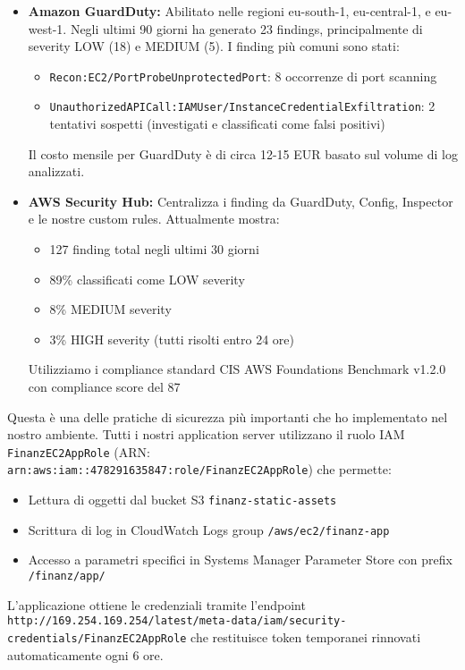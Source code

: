 \begin{itemize}
    \item \textbf{Amazon GuardDuty:} Abilitato nelle regioni eu-south-1, eu-central-1, e eu-west-1. Negli ultimi 90 giorni ha generato 23 findings, principalmente di severity LOW (18) e MEDIUM (5). I finding più comuni sono stati:
        \begin{itemize}
            \item \texttt{Recon:EC2/PortProbeUnprotectedPort}: 8 occorrenze di port scanning
            \item \texttt{UnauthorizedAPICall:IAMUser/InstanceCredentialExfiltration}: 2 tentativi sospetti (investigati e classificati come falsi positivi)
        \end{itemize}
        Il costo mensile per GuardDuty è di circa 12-15 EUR basato sul volume di log analizzati.
    
    \item \textbf{AWS Security Hub:} Centralizza i finding da GuardDuty, Config, Inspector e le nostre custom rules. Attualmente mostra:
        \begin{itemize}
            \item 127 finding total negli ultimi 30 giorni
            \item 89\% classificati come LOW severity
            \item 8\% MEDIUM severity  
            \item 3\% HIGH severity (tutti risolti entro 24 ore)
        \end{itemize}
        Utilizziamo i compliance standard CIS AWS Foundations Benchmark v1.2.0 con compliance score del 87%
\end{itemize}

Questa è una delle pratiche di sicurezza più importanti che ho implementato nel nostro ambiente. Tutti i nostri application server utilizzano il ruolo IAM \texttt{FinanzEC2AppRole} (ARN: \texttt{arn:aws:iam::478291635847:role/FinanzEC2AppRole}) che permette:
\begin{itemize}
    \item Lettura di oggetti dal bucket S3 \texttt{finanz-static-assets}
    \item Scrittura di log in CloudWatch Logs group \texttt{/aws/ec2/finanz-app}
    \item Accesso a parametri specifici in Systems Manager Parameter Store con prefix \texttt{/finanz/app/}
\end{itemize}
L'applicazione ottiene le credenziali tramite l'endpoint \texttt{http://169.254.169.254/latest/meta-data/iam/security-credentials/FinanzEC2AppRole} che restituisce token temporanei rinnovati automaticamente ogni 6 ore.

